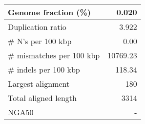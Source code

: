 \documentclass[12pt,a4paper]{article}
\begin{document}
\begin{table}[ht]
\begin{center}
\begin{tabular}{|l*{1}{|r}|}
Genome fraction (\%) & 0.020 \\ \hline
Duplication ratio & 3.922 \\ \hline
\# N's per 100 kbp & 0.00 \\ \hline
\# mismatches per 100 kbp & 10769.23 \\ \hline
\# indels per 100 kbp & 118.34 \\ \hline
Largest alignment & 180 \\ \hline
Total aligned length & 3314 \\ \hline
NGA50 & - \\ \hline
\end{tabular}
\end{center}
\end{table}
\end{document}
